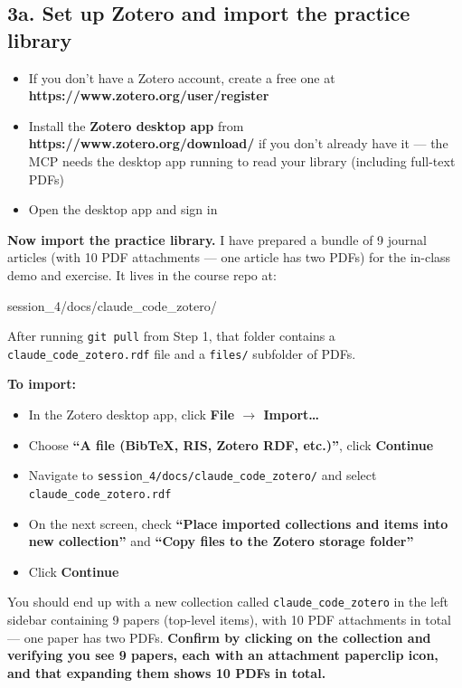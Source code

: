 \documentclass[11pt]{article}
\newcommand{\cmd}[1]{\par\vspace{0.2em}\colorbox{codegray}{\parbox{\dimexpr\linewidth-2\fboxsep}{\ttfamily\small #1}}\par\vspace{0.2em}}
\begin{document}
\subsection*{3a. Set up Zotero and import the practice library}

\begin{itemize}[leftmargin=2em,itemsep=0pt]
  \item If you don't have a Zotero account, create a free one at \textbf{https://www.zotero.org/user/register}
  \item Install the \textbf{Zotero desktop app} from \textbf{https://www.zotero.org/download/} if you don't already have it --- the MCP needs the desktop app running to read your library (including full-text PDFs)
  \item Open the desktop app and sign in
\end{itemize}

\textbf{Now import the practice library.} I have prepared a bundle of 9 journal articles (with 10 PDF attachments --- one article has two PDFs) for the in-class demo and exercise. It lives in the course repo at:

\cmd{session\_4/docs/claude\_code\_zotero/}

After running \texttt{git pull} from Step 1, that folder contains a \texttt{claude\_code\_zotero.rdf} file and a \texttt{files/} subfolder of PDFs.

\textbf{To import:}
\begin{itemize}[leftmargin=2em,itemsep=0pt]
  \item In the Zotero desktop app, click \textbf{File $\rightarrow$ Import\ldots}
  \item Choose \textbf{``A file (BibTeX, RIS, Zotero RDF, etc.)''}, click \textbf{Continue}
  \item Navigate to \texttt{session\_4/docs/claude\_code\_zotero/} and select \texttt{claude\_code\_zotero.rdf}
  \item On the next screen, check \textbf{``Place imported collections and items into new collection''} and \textbf{``Copy files to the Zotero storage folder''}
  \item Click \textbf{Continue}
\end{itemize}

You should end up with a new collection called \texttt{claude\_code\_zotero} in the left sidebar containing 9 papers (top-level items), with 10 PDF attachments in total --- one paper has two PDFs. \textbf{Confirm by clicking on the collection and verifying you see 9 papers, each with an attachment paperclip icon, and that expanding them shows 10 PDFs in total.}
\end{document}
